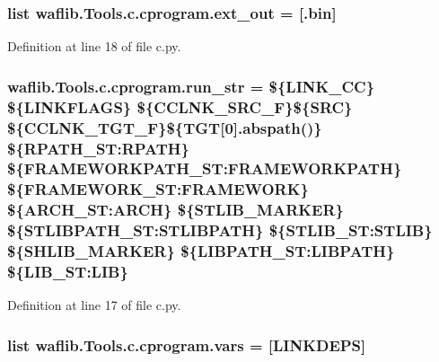 \subsubsection[{\texorpdfstring{ext\+\_\+out}{ext_out}}]{\setlength{\rightskip}{0pt plus 5cm}list waflib.\+Tools.\+c.\+cprogram.\+ext\+\_\+out = \mbox{[}\textquotesingle{}.bin\textquotesingle{}\mbox{]}\hspace{0.3cm}{\ttfamily [static]}}\hypertarget{classwaflib_1_1_tools_1_1c_1_1cprogram_ab89e521669c2122dd0c3afef9c461341}{}\label{classwaflib_1_1_tools_1_1c_1_1cprogram_ab89e521669c2122dd0c3afef9c461341}


Definition at line 18 of file c.\+py.

\subsubsection[{\texorpdfstring{run\+\_\+str}{run_str}}]{ waflib.\+Tools.\+c.\+cprogram.\+run\+\_\+str = \textquotesingle{}\$\{L\+I\+N\+K\+\_\+\+CC\} \$\{L\+I\+N\+K\+F\+L\+A\+GS\} \$\{C\+C\+L\+N\+K\+\_\+\+S\+R\+C\+\_\+F\}\$\{S\+RC\} \$\{C\+C\+L\+N\+K\+\_\+\+T\+G\+T\+\_\+F\}\$\{T\+GT\mbox{[}0\mbox{]}.abspath()\} \$\{R\+P\+A\+T\+H\+\_\+\+S\+T\+:\+R\+P\+A\+TH\} \$\{F\+R\+A\+M\+E\+W\+O\+R\+K\+P\+A\+T\+H\+\_\+\+S\+T\+:\+F\+R\+A\+M\+E\+W\+O\+R\+K\+P\+A\+TH\} \$\{F\+R\+A\+M\+E\+W\+O\+R\+K\+\_\+\+S\+T\+:\+F\+R\+A\+M\+E\+W\+O\+RK\} \$\{A\+R\+C\+H\+\_\+\+S\+T\+:\+A\+R\+CH\} \$\{S\+T\+L\+I\+B\+\_\+\+M\+A\+R\+K\+ER\} \$\{S\+T\+L\+I\+B\+P\+A\+T\+H\+\_\+\+S\+T\+:\+S\+T\+L\+I\+B\+P\+A\+TH\} \$\{S\+T\+L\+I\+B\+\_\+\+S\+T\+:\+S\+T\+L\+IB\} \$\{S\+H\+L\+I\+B\+\_\+\+M\+A\+R\+K\+ER\} \$\{L\+I\+B\+P\+A\+T\+H\+\_\+\+S\+T\+:\+L\+I\+B\+P\+A\+TH\} \$\{L\+I\+B\+\_\+\+S\+T\+:\+L\+IB\}\textquotesingle{}\hspace{0.3cm}{\ttfamily [static]}}\hypertarget{classwaflib_1_1_tools_1_1c_1_1cprogram_a4ac77c6e86bec9d784e54c25ef9bb030}{}\label{classwaflib_1_1_tools_1_1c_1_1cprogram_a4ac77c6e86bec9d784e54c25ef9bb030}


Definition at line 17 of file c.\+py.

\subsubsection[{\texorpdfstring{vars}{vars}}]{\setlength{\rightskip}{0pt plus 5cm}list waflib.\+Tools.\+c.\+cprogram.\+vars = \mbox{[}\textquotesingle{}L\+I\+N\+K\+D\+E\+PS\textquotesingle{}\mbox{]}\hspace{0.3cm}{\ttfamily [static]}}\hypertarget{classwaflib_1_1_tools_1_1c_1_1cprogram_ad645f538f3133d24a27b7819d06c5bed}{}\label{classwaflib_1_1_tools_1_1c_1_1cprogram_ad645f538f3133d24a27b7819d06c5bed}


